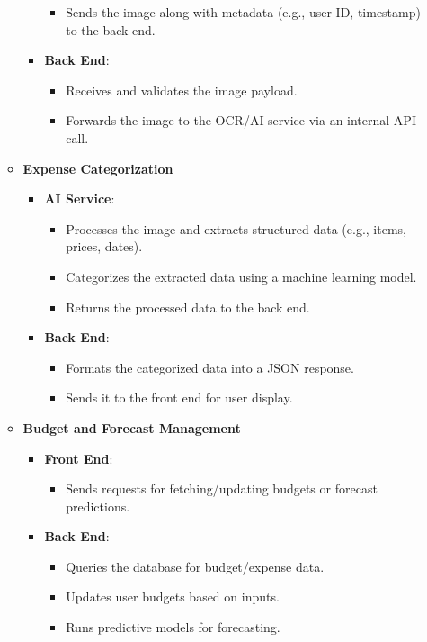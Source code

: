 \documentclass[12pt, titlepage]{article}
\begin{document}
\begin{enumerate}
\begin{itemize}
\begin{itemize}
\begin{itemize}
				\item Sends the image along with metadata (e.g., user ID, timestamp) to the back end.
			\end{itemize}
			\item \textbf{Back End}:
			\begin{itemize}
				\item Receives and validates the image payload.
				\item Forwards the image to the OCR/AI service via an internal API call.
			\end{itemize}
		\end{itemize}
		\item \textbf{Expense Categorization}
		\begin{itemize}
			\item \textbf{AI Service}:
			\begin{itemize}
				\item Processes the image and extracts structured data (e.g., items, prices, dates).
				\item Categorizes the extracted data using a machine learning model.
				\item Returns the processed data to the back end.
			\end{itemize}
			\item \textbf{Back End}:
			\begin{itemize}
				\item Formats the categorized data into a JSON response.
				\item Sends it to the front end for user display.
			\end{itemize}
		\end{itemize}
		\item \textbf{Budget and Forecast Management}
		\begin{itemize}
			\item \textbf{Front End}:
			\begin{itemize}
				\item Sends requests for fetching/updating budgets or forecast predictions.
			\end{itemize}
			\item \textbf{Back End}:
			\begin{itemize}
				\item Queries the database for budget/expense data.
				\item Updates user budgets based on inputs.
				\item Runs predictive models for forecasting.
			\end{itemize}

\end{itemize}
\end{itemize}
\end{enumerate}
\end{document}
